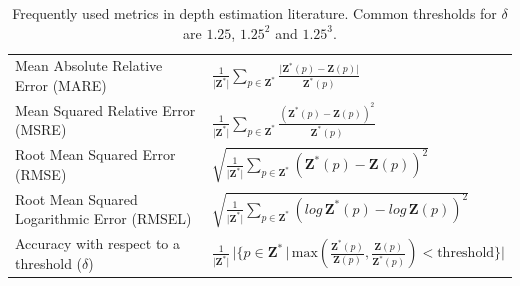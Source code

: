 \begingroup
\renewcommand{\arraystretch}{2.}
\begin{table}
	\begin{tabular}{l|l}
	Mean Absolute Relative Error (MARE) & $\frac{1}{\big| \mathbf{Z}^{*} \big|}\sum_{p \in \mathbf{Z}^{*}} \frac {\big| \mathbf{Z}^{*}(p) - \mathbf{Z}(p) \big|} {\mathbf{Z}^{*}(p)}$ \\
	Mean Squared Relative Error (MSRE) & $\frac{1}{\big| \mathbf{Z}^{*} \big|}\sum_{p \in \mathbf{Z}^{*}} \frac {\left( \mathbf{Z}^{*}(p) - \mathbf{Z}(p) \right)^{2}} {\mathbf{Z}^{*}(p)}$ \\
	Root Mean Squared Error (RMSE) & $\sqrt{
		\frac{1}{\big| \mathbf{Z}^{*} \big|}\sum_{p \in \mathbf{Z}^{*}} \left( \mathbf{Z}^{*}(p) - \mathbf{Z}(p) \right)^{2}
	}$ \\
	Root Mean Squared Logarithmic Error (RMSEL) & $\sqrt{
		\frac{1}{\big| \mathbf{Z}^{*} \big|}\sum_{p \in \mathbf{Z}^{*}} \left( log \, \mathbf{Z}^{*}(p) - log \, \mathbf{Z}(p) \right)^{2}
	}$ \\
	Accuracy with respect to a threshold ($\delta$) & $\frac{1}{\big| \mathbf{Z}^{*} \big|} \, \big| \{p \in \mathbf{Z}^{*} \, | \, \text{max}(
		\frac{\mathbf{Z}^{*}(p)}{\mathbf{Z}(p)},
		\frac{\mathbf{Z}(p)}{\mathbf{Z}^{*}(p)}
	) < \text{threshold} \} \big| $\\
	\end{tabular}
\caption{
    Frequently used metrics in depth estimation literature.
    Common thresholds for $\delta$ are $1.25$, $1.25^{2}$ and $1.25^{3}$.
    \label{t:metrics}}
\end{table}
\endgroup

